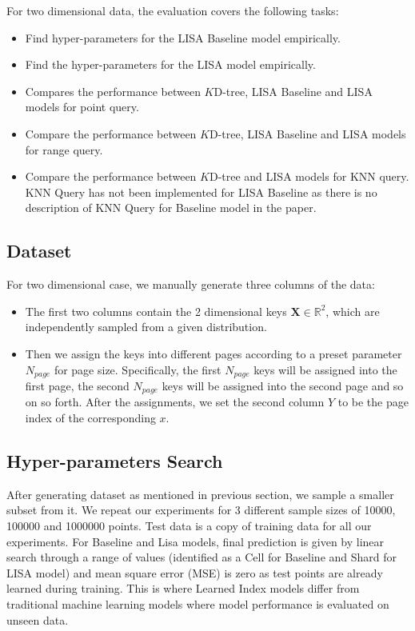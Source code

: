 For two dimensional data, the evaluation covers the following tasks:

\begin{itemize}
 	\item Find hyper-parameters for the LISA Baseline model empirically.
	\item Find the hyper-parameters for the LISA model empirically.
	\item Compares the performance between $K$D-tree, LISA Baseline and LISA models for point query.
	\item Compare the performance between $K$D-tree, LISA Baseline and LISA models for range query.
	\item Compare the performance between $K$D-tree and LISA models for KNN query. KNN Query has not been implemented for LISA Baseline as there is no description of KNN Query for Baseline model in the paper. 
\end{itemize}

\subsection{Dataset}

For two dimensional case, we manually generate three columns of the data:

\begin{itemize}
	\item The first two columns contain the  2 dimensional keys $\boldsymbol{X} \in \mathbb{R}^{2}$, which are independently sampled from a given distribution. %
	\item Then we assign the keys into different pages according to a preset parameter $N_{page}$ for page size. Specifically, the first $N_{page}$ keys will be assigned into the first page, the second $N_{page}$ keys will be assigned into the second page and so on so forth. After the assignments, we set the second column $Y$ to be the page index of the corresponding $x$.
\end{itemize}

\subsection{Hyper-parameters Search}
After generating dataset as mentioned in previous section, we sample a smaller subset from it. We repeat our experiments for 3 different sample sizes of 10000, 100000 and 1000000 points. Test data is a copy of training data for all our experiments. For Baseline and Lisa models, final prediction is given by linear search through a range of values (identified as a Cell for Baseline and Shard for LISA model) and mean square error (MSE) is zero as test points are already learned during training. This is where Learned Index models differ from traditional machine learning models where model performance is evaluated on unseen data. 

